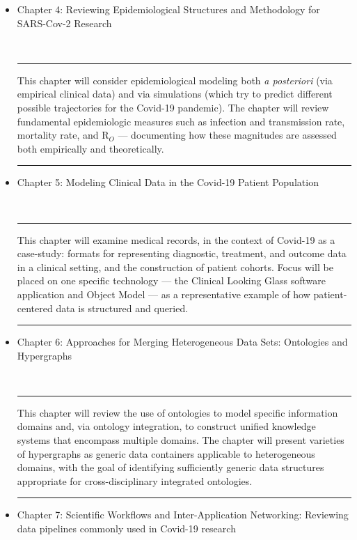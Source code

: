 \documentclass{statsoc}
\newenvironment{summary}{\\\vspace{-4pt}%
%
%
\noindent\hfil\textcolor{rgrey!50!purple}{\rule{0.5\textwidth}{.4pt}}\hfil

\hspace{-2cm}\begin{minipage}{1.02\textwidth}\fontfamily{phv}\fontsize{9}{11}\selectfont}%
{\\\vspace{-1em}\end{minipage}
{\begin{center}\textcolor{rgrey!50!yellow}{\rule{0.5\textwidth}{.4pt}}\end{center}}
\vspace{2em}}%
\begin{document}
{\begin{description}
\begin{itemize}
\item Chapter 4: Reviewing Epidemiological Structures and Methodology for SARS-Cov-2 Research

\begin{summary}
This chapter will consider epidemiological modeling both \textit{a posteriori}
(via empirical clinical data) and via simulations (which try to 
predict different possible trajectories for the Covid-19 pandemic).  
The chapter will review fundamental epidemiologic measures such 
as infection and transmission rate, mortality rate, and R$_O$ --- 
documenting how these magnitudes are assessed both empirically and theoretically. 
\end{summary}

\item Chapter 5: Modeling Clinical Data in the Covid-19 Patient Population  

\begin{summary}
This chapter will examine medical records, in the context of 
Covid-19 as a case-study: formats for representing 
diagnostic, treatment, and outcome data in a clinical setting, 
and the construction of patient cohorts.  Focus will be 
placed on one specific technology --- the 
Clinical Looking Glass software application and Object Model --- 
as a representative example of how patient-centered 
data is structured and queried.
\end{summary}

\end{itemize}

\item[Part II: Creating a Cross-Disciplinary Ecosystem for Covid-19]

\begin{itemize}

\item Chapter 6: Approaches for Merging Heterogeneous Data Sets: Ontologies and Hypergraphs

\begin{summary}
This chapter will review the use of ontologies to model 
specific information domains and, via ontology integration, 
to construct unified knowledge systems that encompass 
multiple domains.  The chapter will present varieties 
of hypergraphs as generic data containers applicable 
to heterogeneous domains, with the goal of identifying 
sufficiently generic data structures appropriate 
for cross-disciplinary integrated ontologies.   
\end{summary}

\item Chapter 7: Scientific Workflows and Inter-Application Networking: 
Reviewing data pipelines commonly used in Covid-19 research


\end{itemize}
\end{description}}
\end{document}
